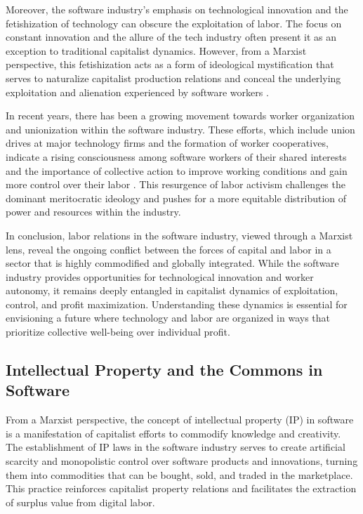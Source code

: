 \begin{refsection}
Moreover, the software industry's emphasis on technological innovation and the fetishization of technology can obscure the exploitation of labor. The focus on constant innovation and the allure of the tech industry often present it as an exception to traditional capitalist dynamics. However, from a Marxist perspective, this fetishization acts as a form of ideological mystification that serves to naturalize capitalist production relations and conceal the underlying exploitation and alienation experienced by software workers \cite[pp.~204-207]{fuchs2017social}.

In recent years, there has been a growing movement towards worker organization and unionization within the software industry. These efforts, which include union drives at major technology firms and the formation of worker cooperatives, indicate a rising consciousness among software workers of their shared interests and the importance of collective action to improve working conditions and gain more control over their labor \cite[pp.~141-144]{schneider2020tech}. This resurgence of labor activism challenges the dominant meritocratic ideology and pushes for a more equitable distribution of power and resources within the industry.

In conclusion, labor relations in the software industry, viewed through a Marxist lens, reveal the ongoing conflict between the forces of capital and labor in a sector that is highly commodified and globally integrated. While the software industry provides opportunities for technological innovation and worker autonomy, it remains deeply entangled in capitalist dynamics of exploitation, control, and profit maximization. Understanding these dynamics is essential for envisioning a future where technology and labor are organized in ways that prioritize collective well-being over individual profit.

\subsection{Intellectual Property and the Commons in Software}

From a Marxist perspective, the concept of intellectual property (IP) in software is a manifestation of capitalist efforts to commodify knowledge and creativity. The establishment of IP laws in the software industry serves to create artificial scarcity and monopolistic control over software products and innovations, turning them into commodities that can be bought, sold, and traded in the marketplace. This practice reinforces capitalist property relations and facilitates the extraction of surplus value from digital labor.


\end{refsection}
